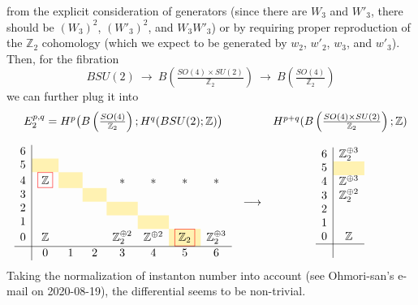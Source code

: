 \documentclass[12pt]{article}
\numberwithin{equation}{section}
\newcommand*{\red}[1]{\textcolor{red}{#1}}
\newcommand*{\black}[1]{\textcolor{black}{#1}}
\def\bZ{\mathbb{Z}}
\begin{document}
from the explicit consideration of generators (since there are $W_3$ and $W'_3$, there should be $(W_3)^2$, $(W'_3)^2$, and $W_3W'_3$)
or by requiring proper reproduction of the $\bZ_2$ cohomology (which we expect to be generated by $w_2$, $w'_2$, $w_3$, and $w'_3$).
Then, for the fibration
\begin{equation}
	BSU(2)
	\ \to\ 
	B\left(\tfrac{SO(4)\times SU(2)}{\bZ_2}\right)
	\ \to\ 
	B\left(\tfrac{SO(4)}{\bZ_2}\right)
\end{equation}
we can further plug it into
\begin{equation}
	\begin{array}{ccc}
		E_2^{p,q}=H^p\big(B\left(\tfrac{SO(4)}{\bZ_2}\right);H^q(BSU(2);\bZ)\big) && H^{p+q}(B\left(\tfrac{SO(4)\times SU(2)}{\bZ_2}\right);\bZ)\vspace{4mm}\\
		\begin{array}{c|ccccccccccccc}
			6  &&&&&& \\
			5  & \cellcolor{lightyellow} & \hphantom{\bZ_2} & \hphantom{\bZ_2} & \hphantom{\bZ_2} & \hphantom{\bZ_2} & \hphantom{\bZ_2} \\
			4  & \red{\fbox{\black{$\bZ$}}} & \cellcolor{lightyellow} && \ast & \ast & \ast & \ast\\
			3  &  && \cellcolor{lightyellow} &&&\\
			2  &&  && \cellcolor{lightyellow} &&\\
			1  &  &&  && \cellcolor{lightyellow} &&\\
			0 & \bZ &  && \bZ_2^{\oplus 2} & \bZ^{\oplus 2} & \red{\fbox{\black{$\bZ_2$}}}\cellcolor{lightyellow} & \bZ_2^{\oplus 3}\\
			\hline
			& 0 & 1 & 2 & 3 & 4 & 5 & 6 \\
		\end{array}
		& \longrightarrow & 
		\begin{array}{c|c}
			6  & \bZ_2^{\oplus 3}\\
			5  & \cellcolor{lightyellow}\\
			4  & \bZ^{\oplus 3}\\
			3  & \bZ_2^{\oplus 2}\\
			2  & \\
			1  & \\
			0 & \bZ\\
			\hline\\
		\end{array}
	\end{array}
\end{equation}
Taking the normalization of instanton number into account (see Ohmori-san's e-mail on 2020-08-19),
the differential \red{\fbox{\black{$d_2 : E_{0,4} \to E_{5,0}$}}} seems to be non-trivial.
\end{document}
